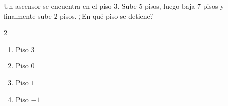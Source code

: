 Un ascensor se encuentra en el piso \(3\). Sube \(5\) pisos, luego baja \(7\) pisos y finalmente sube \(2\) pisos. ¿En qué piso se detiene?
\begin{multicols}{2}
\begin{enumerate}[label=\alph*)]
\item Piso \(3\)
\item Piso \(0\)
\item Piso \(1\)
\item Piso \(-1\)
\end{enumerate}
\end{multicols}